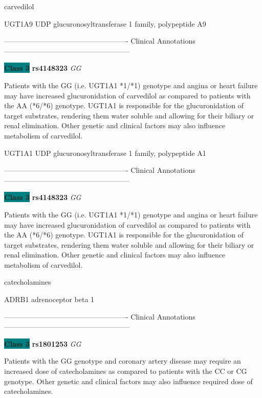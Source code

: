 \documentclass{resume} %
\begin{document}
\begin{rSection}{ carvedilol }
\begin{rSubsection}{ UGT1A9 }{ UDP glucuronosyltransferase 1 family, polypeptide A9 }{}{}
\item[] ---------------------------------------------------- Clinical Annotations -----------------------------------------------------\newline
\item \textbf{\colorbox{teal} {Class 3}} \textbf{ rs4148323 } \textit{ GG }
\item[] Patients with the GG (i.e. UGT1A1 *1/*1) genotype and angina or heart failure may have increased glucuronidation of carvedilol as compared to patients with the AA (*6/*6) genotype. UGT1A1 is responsible for the glucuronidation of target substrates, rendering them water soluble and allowing for their biliary or renal elimination. Other genetic and clinical factors may also influence metabolism of carvedilol.
\end{rSubsection}\begin{rSubsection}{ UGT1A1 }{ UDP glucuronosyltransferase 1 family, polypeptide A1 }{}{}
\item[]

\item[] ---------------------------------------------------- Clinical Annotations -----------------------------------------------------\newline
\item \textbf{\colorbox{teal} {Class 3}} \textbf{ rs4148323 } \textit{ GG }
\item[] Patients with the GG (i.e. UGT1A1 *1/*1) genotype and angina or heart failure may have increased glucuronidation of carvedilol as compared to patients with the AA (*6/*6) genotype. UGT1A1 is responsible for the glucuronidation of target substrates, rendering them water soluble and allowing for their biliary or renal elimination. Other genetic and clinical factors may also influence metabolism of carvedilol.
\end{rSubsection}

\end{rSection}\begin{rSection}{ catecholamines }
\item[]

\begin{rSubsection}{ ADRB1 }{ adrenoceptor beta 1 }{}{}
\item[]

\item[] ---------------------------------------------------- Clinical Annotations -----------------------------------------------------\newline
\item \textbf{\colorbox{teal} {Class 3}} \textbf{ rs1801253 } \textit{ GG }
\item[] Patients with the GG genotype and coronary artery disease may require an increased dose of catecholamines as compared to patients with the CC or CG genotype. Other genetic and clinical factors may also influence required dose of catecholamines.
\end{rSubsection}


\end{rSection}
\end{document}
